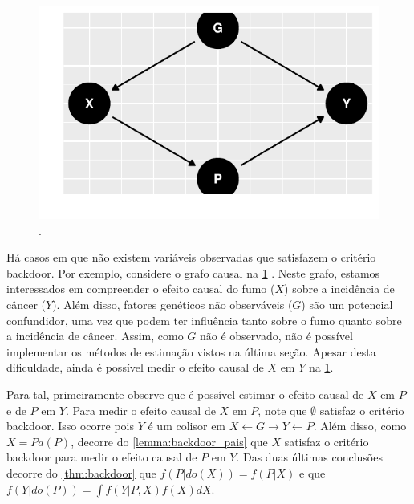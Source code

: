 \begin{knitrout}
\color{fgcolor}\begin{figure}[t]

{\centering \includegraphics[width=\maxwidth]{./figures/frontdoor_ex_1-1} 

}

\caption[]{.}\label{fig:frontdoor_ex_1}
\end{figure}

\end{knitrout}

Há casos em que não existem variáveis observadas que 
satisfazem o critério backdoor.
Por exemplo, considere o grafo causal 
na \cref{fig:frontdoor_ex_1} \citep{Glymour2016}.
Neste grafo, estamos interessados em
compreender o efeito causal
do fumo ($X$) sobre a incidência de câncer ($Y$).
Além disso, fatores genéticos não observáveis ($G$)
são um potencial confundidor, uma vez que 
podem ter influência tanto sobre o fumo quanto 
sobre a incidência de câncer.
Assim, como $G$ não é observado,
não é possível implementar 
os métodos de estimação vistos na última seção.
Apesar desta dificuldade, 
ainda é possível medir o efeito causal de $X$ em $Y$
na \cref{fig:frontdoor_ex_1}.

Para tal, primeiramente observe que
é possível estimar o efeito causal de $X$ em $P$ 
e de $P$ em $Y$. 
Para medir o efeito causal de $X$ em $P$,
note que $\emptyset$ satisfaz o critério backdoor.
Isso ocorre pois $Y$ é um colisor em
$X \leftarrow G \rightarrow Y \leftarrow P$.
Além disso, como $X = Pa(P)$, decorre
do \cref{lemma:backdoor_pais} que
$X$ satisfaz o critério backdoor para
medir o efeito causal de $P$ em $Y$.
Das duas últimas conclusões decorre do
\cref{thm:backdoor} que
$f(P|do(X)) = f(P|X)$ e que 
$f(Y|do(P)) = \int f(Y|P,X)f(X)dX$.

